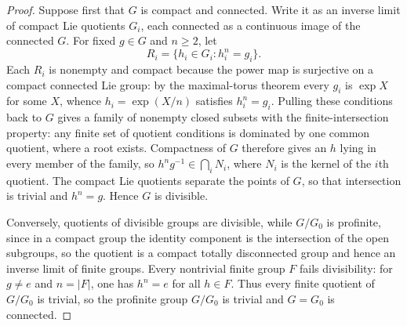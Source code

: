 \documentclass[12pt,a4paper]{article}
\begin{document}
\begin{proof}
Suppose first that \(G\) is compact and connected.  Write it as an inverse
limit of compact Lie quotients \(G_i\), each connected as a continuous image
of the connected \(G\).  For fixed \(g\in G\) and
\(n\ge2\), let
\[
 R_i=\{h_i\in G_i:h_i^n=g_i\}.
\]
Each \(R_i\) is nonempty and compact because the power map is surjective on a
compact connected Lie group: by the maximal-torus theorem every \(g_i\) is
\(\exp X\) for some \(X\), whence \(h_i=\exp(X/n)\) satisfies \(h_i^n=g_i\).  Pulling these conditions back to \(G\) gives a
family of nonempty closed subsets with the finite-intersection property: any
finite set of quotient conditions is dominated by one common quotient, where
a root exists.  Compactness of \(G\) therefore gives an \(h\) lying in every
member of the family, so \(h^ng^{-1}\in\bigcap_iN_i\), where \(N_i\) is the
kernel of the \(i\)th quotient.  The compact Lie quotients separate the points
of \(G\), so that intersection is trivial and \(h^n=g\).  Hence
\(G\) is divisible.

Conversely, quotients of divisible groups are divisible, while
\(G/G_0\) is profinite, since in a compact group the identity component is the
intersection of the open subgroups, so the quotient is a compact totally
disconnected group and hence an inverse limit of finite groups.  Every nontrivial finite group \(F\) fails
divisibility: for \(g\ne e\) and \(n=|F|\), one has \(h^n=e\) for all
\(h\in F\).  Thus every finite quotient of \(G/G_0\) is trivial, so the
profinite group \(G/G_0\) is trivial and \(G=G_0\) is connected.
\end{proof}
\end{document}

